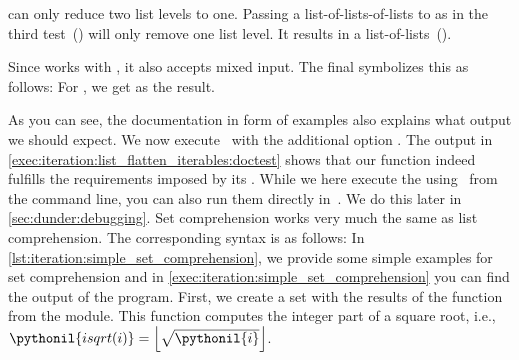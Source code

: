  can only reduce two list levels to one.
Passing a list-of-lists-of-lists to  as in the third test~() will only remove one list level.
It results in a list-of-lists~(\pythonil{[[1], [2], [3], [4], [5], [6]]}).%
%
\begin{sloppypar}%
Since  works with , it also accepts mixed input.
The final  symbolizes this as follows:
For , we get \pythonil{[1, 2, 3, 4, 5, 6, 'a', 'b']} as the result.
\end{sloppypar}%
%
As you can see, the documentation in form of examples also explains what output we should expect.
We now execute \pytest\ with the additional option .
The output in \cref{exec:iteration:list_flatten_iterables:doctest} shows that our function indeed fulfills the requirements imposed by its .%
%
%
%
While we here execute the  using \pytest\ from the command line, you can also run them directly in~\pycharm.
We do this later in \cref{sec:dunder:debugging}.%
%
\FloatBarrier%
\endhsection%
%
%
%
Set comprehension works very much the same as list comprehension.
The corresponding syntax is as follows:%
%
%
%
%
%
%
In \cref{lst:iteration:simple_set_comprehension}, we provide some simple examples for set comprehension and in \cref{exec:iteration:simple_set_comprehension} you can find the output of the program.
First, we create a set with the results of the  function from the  module.
This function computes the integer part of a square root, i.e., $\pythonil{isqrt(i)}=\left\lfloor\sqrt{\pythonil{i}}\right\rfloor$.
